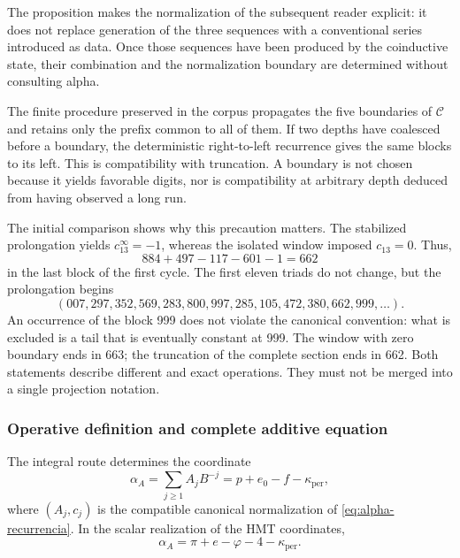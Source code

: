 The proposition makes the normalization of the subsequent reader explicit:
it does not replace generation of the three sequences with a conventional
series introduced as data. Once those sequences have been produced by the
coinductive state, their combination and the normalization boundary are
determined without consulting alpha.

The finite procedure preserved in the corpus propagates the five boundaries
of \(\mathcal C\) and retains only the prefix common to all of them. If two
depths have coalesced before a boundary, the deterministic right-to-left
recurrence gives the same blocks to its left. This is compatibility with
truncation. A boundary is not chosen because it yields favorable digits, nor
is compatibility at arbitrary depth deduced from having observed a long run.

The initial comparison shows why this precaution matters. The stabilized
prolongation yields \(c_{13}^{\infty}=-1\), whereas the isolated window
imposed \(c_{13}=0\). Thus,
\[
 884+497-117-601-1=662
\]
in the last block of the first cycle. The first eleven triads do not change,
but the prolongation begins
\[
 (007,297,352,569,283,800,997,285,105,472,380,662,999,\ldots).
\]
An occurrence of the block 999 does not violate the canonical convention:
what is excluded is a tail that is eventually constant at 999. The window
with zero boundary ends in 663; the truncation of the complete section ends
in 662. Both statements describe different and exact operations. They must
not be merged into a single projection notation.

\subsubsection{Operative definition and complete additive equation}
\label{subsec:alpha-definicion}

\begin{definition}
\label{def:alpha-operativa}
The integral route determines the coordinate
\begin{equation}
 \alpha_A=\sum_{j\geq1}A_jB^{-j}
 =p+e_0-f-\kappa_{\mathrm{per}},
 \label{eq:alpha-via-a}
\end{equation}
where \((A_j,c_j)\) is the compatible canonical normalization of
\eqref{eq:alpha-recurrencia}. In the scalar realization of the HMT
coordinates,
\begin{equation}
 \boxed{\alpha_A=
 \pi+e-\varphi
 -4-\kappa_{\mathrm{per}}.}
 \label{eq:alpha-identidad-completa}
\end{equation}
\end{definition}

